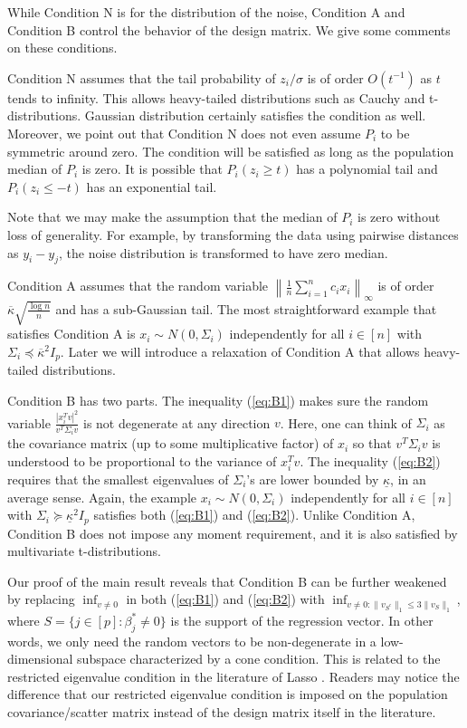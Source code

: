 While Condition N is for the distribution of the noise, Condition A and Condition B control the behavior of the design matrix. We give some comments on these conditions.

Condition N assumes that the tail probability of $z_i/\sigma$ is of order $O(t^{-1})$ as $t$ tends to infinity. This allows heavy-tailed distributions such as Cauchy and t-distributions. Gaussian distribution certainly satisfies the condition as well. Moreover, we point out that Condition N does not even assume $P_i$ to be symmetric around zero. The condition will be satisfied as long as the population median of $P_i$ is zero. It is possible that $P_i(z_i\geq t)$ has a polynomial tail and $P_i(z_i\leq -t)$ has an exponential tail.

Note that we may make the assumption that the median of $P_i$ is zero without loss
of generality. For example, by transforming the data using pairwise
distances as $y_i - y_j$, the noise distribution is transformed to have
zero median.

Condition A assumes that the random variable $\left\|\frac{1}{n}\sum_{i=1}^nc_ix_i\right\|_{\infty}$ is of order $\overline{\kappa}\sqrt{\frac{\log n}{n}}$ and has a sub-Gaussian tail. The most straightforward example that satisfies Condition A is $x_i\sim N(0,\Sigma_i)$ independently for all $i\in[n]$ with $\Sigma_i\preceq \overline{\kappa}^2I_p$. Later we will introduce a relaxation of Condition A that allows heavy-tailed distributions.

Condition B has two parts. The inequality (\ref{eq:B1}) makes sure the random variable $\frac{|x_i^Tv|^2}{v^T\Sigma_i v}$ is not degenerate at any direction $v$. Here, one can think of $\Sigma_i$ as the covariance matrix (up to some multiplicative factor) of $x_i$ so that $v^T\Sigma_iv$ is understood to be proportional to the variance of $x_i^Tv$. The inequality (\ref{eq:B2}) requires that the smallest eigenvalues of $\Sigma_i$'s are lower bounded by $\underline{\kappa}$, in an average sense. Again, the example $x_i\sim N(0,\Sigma_i)$ independently for all $i\in[n]$ with $\Sigma_i\succeq \underline{\kappa}^2I_p$ satisfies both (\ref{eq:B1}) and (\ref{eq:B2}). Unlike Condition A, Condition B does not impose any moment requirement, and it is also satisfied by multivariate t-distributions.

Our proof of the main result reveals that Condition B can be further weakened by replacing $\inf_{v\neq 0}$ in both (\ref{eq:B1}) and (\ref{eq:B2}) with $\inf_{v\neq 0: \|v_{S^c}\|_1\leq 3\|v_S\|_1}$, where $S=\{j\in[p]:\beta_j^*\neq 0\}$ is the support of the regression vector. In other words, we only need the random vectors to be non-degenerate in a low-dimensional subspace characterized by a cone condition. This is related to the restricted eigenvalue condition in the literature of Lasso \citep{bickel2009simultaneous}. Readers may notice the difference that our restricted eigenvalue condition is imposed on the population covariance/scatter matrix instead of the design matrix itself in the literature.

